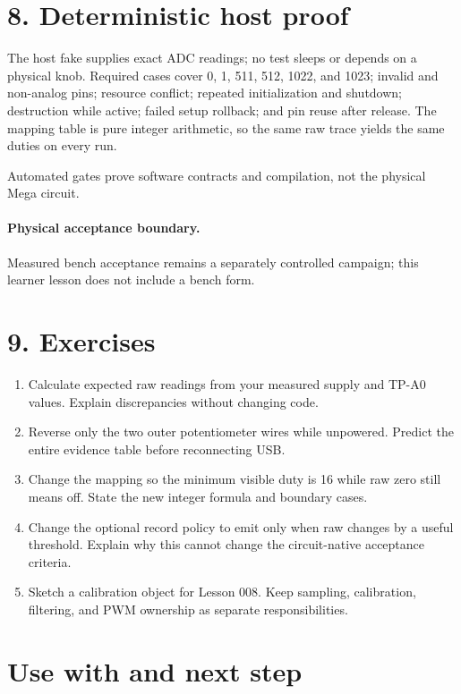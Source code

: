 \documentclass[11pt]{article}
\begin{document}
\section*{8. Deterministic host proof}

The host fake supplies exact ADC readings; no test sleeps or depends on a
physical knob. Required cases cover 0, 1, 511, 512, 1022, and 1023; invalid and
non-analog pins; resource conflict; repeated initialization and shutdown;
destruction while active; failed setup rollback; and pin reuse after release.
The mapping table is pure integer arithmetic, so the same raw trace yields the
same duties on every run.


Automated gates prove software contracts and compilation, not the physical
Mega circuit.

\paragraph{Physical acceptance boundary.}
Measured bench acceptance remains a separately controlled campaign; this
learner lesson does not include a bench form.
\section*{9. Exercises}

\begin{enumerate}
    \item Calculate expected raw readings from your measured supply and TP-A0
    values. Explain discrepancies without changing code.
    \item Reverse only the two outer potentiometer wires while unpowered.
    Predict the entire evidence table before reconnecting USB.
    \item Change the mapping so the minimum visible duty is 16 while raw zero
    still means off. State the new integer formula and boundary cases.
    \item Change the optional record policy to emit only when raw changes by a
    useful threshold. Explain why this cannot change the circuit-native
    acceptance criteria.
    \item Sketch a calibration object for Lesson 008. Keep sampling,
    calibration, filtering, and PWM ownership as separate responsibilities.
\end{enumerate}

\section*{Use with and next step}
\end{document}
